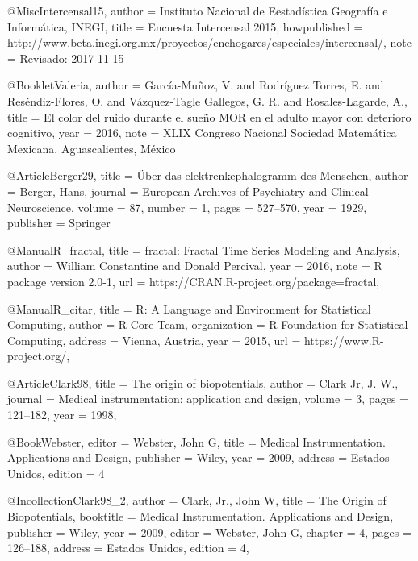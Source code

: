 @Misc{Intercensal15,
    author       = {{Instituto Nacional de Eestadística Geografía e Informática, INEGI}},
    title        = {{Encuesta Intercensal} 2015},
    howpublished = {\url{http://www.beta.inegi.org.mx/proyectos/enchogares/especiales/intercensal/}},
    note         = {Revisado: 2017-11-15}
}

@Booklet{Valeria,
    author =    {Garc\'ia-Mu\~noz, V.
    		     and Rodr\'iguez Torres, E.
    		     and Res\'endiz-Flores, O.
                 and V\'azquez-Tagle Gallegos, G. R.
                 and Rosales-Lagarde, A.},
    title =     {El color del ruido durante el sueño {MOR} en el adulto mayor con deterioro 
    			 cognitivo},
    year =      {2016},
    note =      {XLIX Congreso Nacional Sociedad Matemática Mexicana. Aguascalientes, M\'exico}
}

@Article{Berger29,
    title     = {{\"U}ber das elektrenkephalogramm des {M}enschen},
    author    = {Berger, Hans},
    journal   = {European Archives of Psychiatry and Clinical Neuroscience},
    volume    = {87},
    number    = {1},
    pages     = {527--570},
    year      = {1929},
    publisher = {Springer}
}

@Manual{R_fractal,
  title  = {fractal: Fractal Time Series Modeling and Analysis},
  author = {William Constantine and Donald Percival},
  year   = {2016},
  note   = {R package version 2.0-1},
  url    = {https://CRAN.R-project.org/package=fractal},
}

@Manual{R_citar,
  title        = {R: A Language and Environment for Statistical Computing},
  author       = {{R Core Team}},
  organization = {R Foundation for Statistical Computing},
  address      = {Vienna, Austria},
  year         = {2015},
  url          = {https://www.R-project.org/},
}

@Article{Clark98,
   title   = {The origin of biopotentials},
   author  = {Clark Jr, J. W.},
   journal = {Medical instrumentation: application and design},
   volume  = {3},
   pages   = {121--182},
   year    = {1998},
}

@Book{Webster,
    editor       = {Webster, John G}, 
    title        = {Medical {I}nstrumentation. {A}pplications and {D}esign},
    publisher    = {Wiley},
    year         = {2009},
    address      = {Estados Unidos},
    edition      = {4}
}

@Incollection{Clark98_2,
    author       = {Clark, Jr., John W}, 
    title        = {The {O}rigin of {B}iopotentials},
    booktitle    = {Medical {I}nstrumentation. {A}pplications and {D}esign},
    publisher    = {Wiley},
    year         = {2009},
    editor       = {Webster, John G},
    chapter      = {4},
    pages        = {126--188},
    address      = {Estados Unidos},
    edition      = {4},
}

